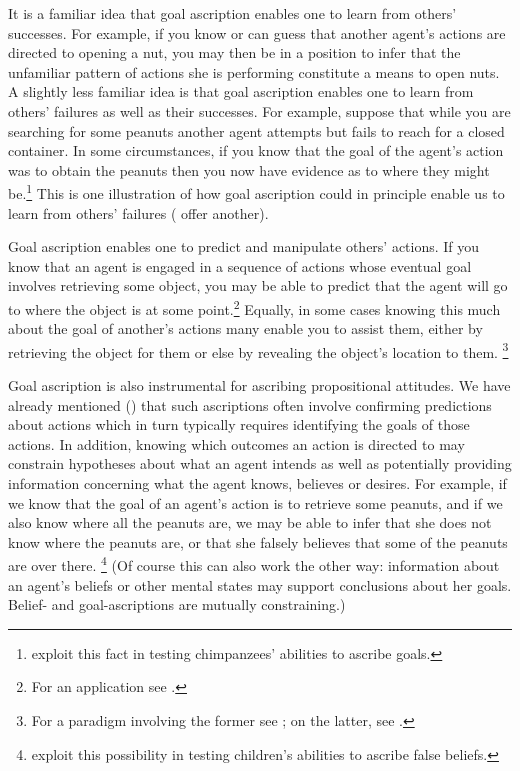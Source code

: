 \documentclass[12pt,a4paper]{extarticle}
\begin{document}
It is a familiar idea that goal ascription enables one to learn from others' successes.
For example,
if you know or can guess that another agent's actions are directed to opening a nut,
you may then be in a position to infer that the unfamiliar pattern of actions she is performing constitute a means to open nuts.
A slightly less familiar idea is that goal ascription enables one to learn from others' failures as well as their successes.
For example, suppose that while you are searching for some peanuts 
another agent attempts but fails to reach for a closed container.
In some circumstances,
if you know that the goal of the agent's action was to obtain the peanuts
then you now have evidence as to where they might be.\footnote{
\citet{hare_chimpanzees_2004} exploit this fact in testing chimpanzees' abilities to ascribe goals.
}
This is one illustration of how goal ascription could in principle enable us to learn from others' failures 
(\citealp{Want:2001hp} offer another).


Goal ascription enables one
to predict and manipulate others' actions.
If you know that an agent is engaged in a sequence of actions whose eventual goal involves retrieving some object,
you may be able to predict that the agent will go to where the object is at some point.\footnote{
For an application see \citet{Hare:2001ph}.
}
Equally, in some cases knowing this much about the goal of another's actions many enable you to assist them,
either 
by retrieving the object for them 
or else
by revealing the object's location to them.%
\footnote{
For a paradigm involving the former see \citet{warneken:2007sa};
on the latter, see \citet{Liszkowski:2008al}.
}

Goal ascription is also instrumental for ascribing propositional attitudes.
We have already mentioned 
   ()
that such ascriptions often involve 
confirming predictions about actions 
which in turn typically requires
identifying the goals of those actions.
In addition,
knowing which outcomes an action is directed to may constrain hypotheses about what an agent intends 
as well as
potentially providing information concerning what the agent knows, believes or desires.
For example,
if we know that the goal of an agent's action is to retrieve some peanuts,
and if we also know where all the peanuts are,
we may be able to infer that she does not know where the peanuts are,
or that she falsely believes that some of the peanuts are over there.%
\footnote{
\citet{Wimmer:1998kx} exploit this possibility in testing children's abilities to ascribe false beliefs.
}
(Of course this can also work the other way:
information about an agent's beliefs or other mental states may support conclusions about her goals.
Belief- and goal-ascriptions are mutually constraining.)
\end{document}
